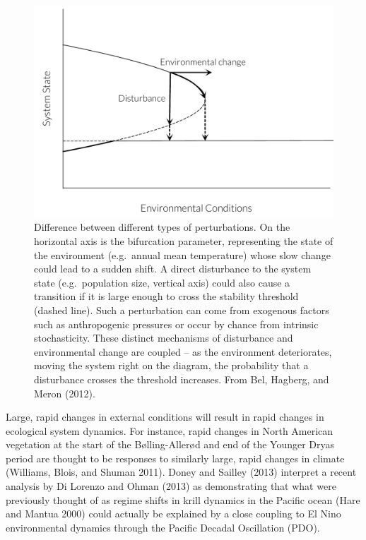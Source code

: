 \documentclass[author-year, review]{elsarticle} %
\makeatletter
\def\maxwidth{\ifdim\Gin@nat@width>\linewidth\linewidth
\else\Gin@nat@width\fi}
\let\Oldincludegraphics\includegraphics
\renewcommand{\includegraphics}[1]{\Oldincludegraphics[width=\maxwidth]{#1}}
\makeatother
\begin{document}
\begin{figure}[htbp]
\centering
\includegraphics{Bel2012example.pdf}
\caption{Difference between different types of perturbations. On the
horizontal axis is the bifurcation parameter, representing the state of
the environment (e.g.~annual mean temperature) whose slow change could
lead to a sudden shift. A direct disturbance to the system state
(e.g.~population size, vertical axis) could also cause a transition if
it is large enough to cross the stability threshold (dashed line). Such
a perturbation can come from exogenous factors such as anthropogenic
pressures or occur by chance from intrinsic stochasticity. These
distinct mechanisms of disturbance and environmental change are coupled
-- as the environment deteriorates, moving the system right on the
diagram, the probability that a disturbance crosses the threshold
increases. From Bel, Hagberg, and Meron (2012).}
\end{figure}

Large, rapid changes in external conditions will result in rapid changes
in ecological system dynamics. For instance, rapid changes in North
American vegetation at the start of the Bølling-Allerød and end of the
Younger Dryas period are thought to be responses to similarly large,
rapid changes in climate (Williams, Blois, and Shuman 2011). Doney and
Sailley (2013) interpret a recent analysis by Di Lorenzo and Ohman
(2013) as demonstrating that what were previously thought of as regime
shifts in krill dynamics in the Pacific ocean (Hare and Mantua 2000)
could actually be explained by a close coupling to El Nino environmental
dynamics through the Pacific Decadal Oscillation (PDO).
\end{document}
